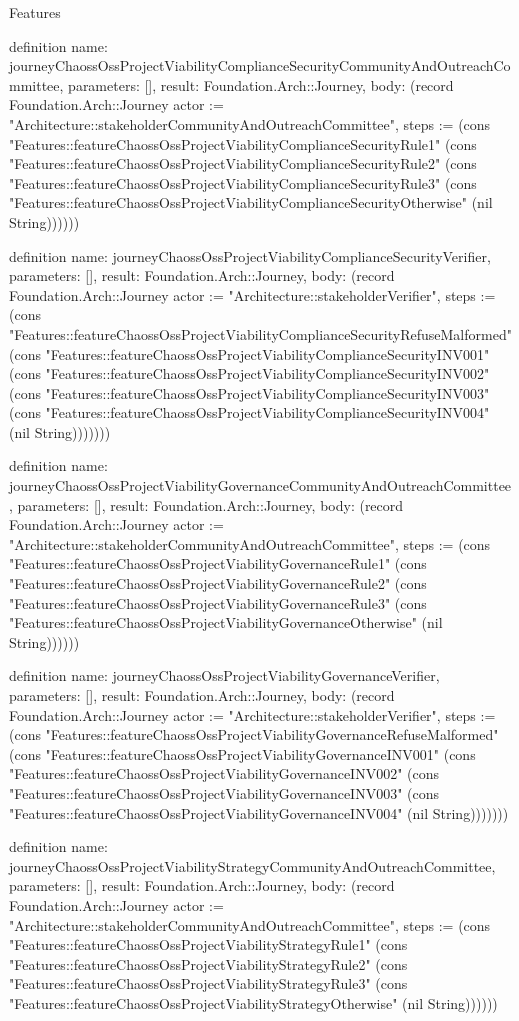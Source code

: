 \begin{lexlean}{Features}
\begin{semanticmodule}
definition{
  name: journeyChaossOssProjectViabilityComplianceSecurityCommunityAndOutreachCommittee,
  parameters: [],
  result: Foundation.Arch::Journey,
  body: (record Foundation.Arch::Journey {actor := "Architecture::stakeholderCommunityAndOutreachCommittee", steps := (cons "Features::featureChaossOssProjectViabilityComplianceSecurityRule1" (cons "Features::featureChaossOssProjectViabilityComplianceSecurityRule2" (cons "Features::featureChaossOssProjectViabilityComplianceSecurityRule3" (cons "Features::featureChaossOssProjectViabilityComplianceSecurityOtherwise" (nil String)))))})
}

definition{
  name: journeyChaossOssProjectViabilityComplianceSecurityVerifier,
  parameters: [],
  result: Foundation.Arch::Journey,
  body: (record Foundation.Arch::Journey {actor := "Architecture::stakeholderVerifier", steps := (cons "Features::featureChaossOssProjectViabilityComplianceSecurityRefuseMalformed" (cons "Features::featureChaossOssProjectViabilityComplianceSecurityINV001" (cons "Features::featureChaossOssProjectViabilityComplianceSecurityINV002" (cons "Features::featureChaossOssProjectViabilityComplianceSecurityINV003" (cons "Features::featureChaossOssProjectViabilityComplianceSecurityINV004" (nil String))))))})
}

definition{
  name: journeyChaossOssProjectViabilityGovernanceCommunityAndOutreachCommittee,
  parameters: [],
  result: Foundation.Arch::Journey,
  body: (record Foundation.Arch::Journey {actor := "Architecture::stakeholderCommunityAndOutreachCommittee", steps := (cons "Features::featureChaossOssProjectViabilityGovernanceRule1" (cons "Features::featureChaossOssProjectViabilityGovernanceRule2" (cons "Features::featureChaossOssProjectViabilityGovernanceRule3" (cons "Features::featureChaossOssProjectViabilityGovernanceOtherwise" (nil String)))))})
}

definition{
  name: journeyChaossOssProjectViabilityGovernanceVerifier,
  parameters: [],
  result: Foundation.Arch::Journey,
  body: (record Foundation.Arch::Journey {actor := "Architecture::stakeholderVerifier", steps := (cons "Features::featureChaossOssProjectViabilityGovernanceRefuseMalformed" (cons "Features::featureChaossOssProjectViabilityGovernanceINV001" (cons "Features::featureChaossOssProjectViabilityGovernanceINV002" (cons "Features::featureChaossOssProjectViabilityGovernanceINV003" (cons "Features::featureChaossOssProjectViabilityGovernanceINV004" (nil String))))))})
}

definition{
  name: journeyChaossOssProjectViabilityStrategyCommunityAndOutreachCommittee,
  parameters: [],
  result: Foundation.Arch::Journey,
  body: (record Foundation.Arch::Journey {actor := "Architecture::stakeholderCommunityAndOutreachCommittee", steps := (cons "Features::featureChaossOssProjectViabilityStrategyRule1" (cons "Features::featureChaossOssProjectViabilityStrategyRule2" (cons "Features::featureChaossOssProjectViabilityStrategyRule3" (cons "Features::featureChaossOssProjectViabilityStrategyOtherwise" (nil String)))))})
}


\end{semanticmodule}
\end{lexlean}
